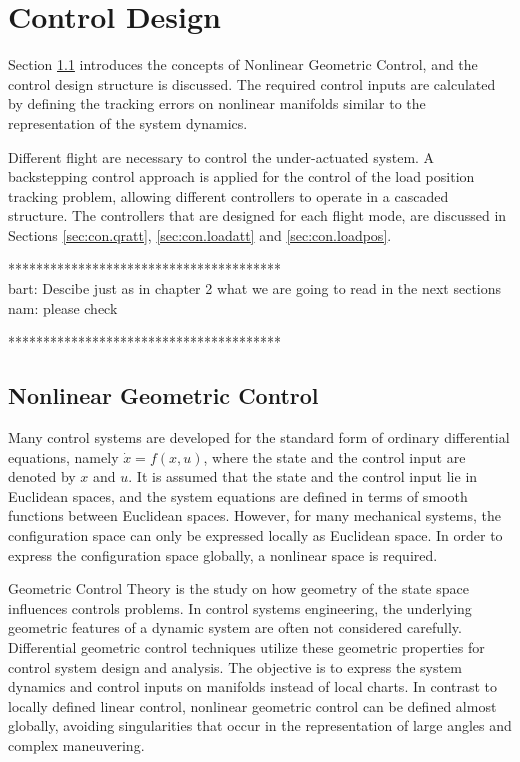 \chapter{Control Design} \label{ch:control}
Section \ref{sec:con.nlgc} introduces the concepts of Nonlinear Geometric Control, and the control design structure is discussed. 
The required control inputs are calculated by defining the tracking errors on nonlinear manifolds similar to the representation of the system dynamics.

Different flight are necessary to control the under-actuated system. A backstepping control approach is applied for the control of the load position tracking problem, allowing different controllers to operate in a cascaded structure. The controllers that are designed for each flight mode, are discussed in Sections \ref{sec:con.qratt}, \ref{sec:con.loadatt} and \ref{sec:con.loadpos}. 


***************************************\\
bart: Descibe just as in chapter 2 what we are going to read in the next sections\\
nam: please check

***************************************\\

\section{Nonlinear Geometric Control}\label{sec:con.nlgc}
Many control systems are developed for the standard form of ordinary differential equations, namely $ \dot{x}=f(x,u) $, where the state and the control input are denoted by $ x $ and $ u $. It is assumed that the state and the control input lie in Euclidean spaces, and the system equations are defined in terms of smooth functions between Euclidean spaces. However, for many mechanical systems, the configuration space can only be expressed locally as Euclidean space. In order to express the configuration space globally, a nonlinear space is required.

Geometric Control Theory is the study on how geometry of the state space influences controls problems. 
In control systems engineering, the underlying geometric features of a dynamic system are often not considered carefully. 
Differential geometric control techniques utilize these geometric properties for control system design and analysis.
The objective is to express the system dynamics and control inputs on manifolds instead of local charts. 
In contrast to locally defined linear control, nonlinear geometric control can be defined almost globally, avoiding singularities that occur in the representation of large angles and complex maneuvering.

